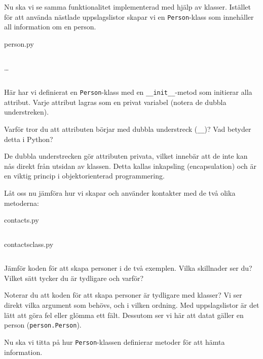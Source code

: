 Nu ska vi se samma funktionalitet implementerad med hjälp av klasser.
Istället för att använda nästlade uppslagslistor skapar vi en
\texttt{Person}-klass som innehåller all information om en person.

\begin{frame}[fragile]
  person.py \hrulefill
  \inputminted[linenos,firstline=3,lastline=15]{python}{examples/person.py}
  \dots
  \inputminted[linenos,firstline=65,lastline=68]{python}{examples/person.py}
\end{frame}

Här har vi definierat en \texttt{Person}-klass med en 
\texttt{__init__}-metod som initierar alla attribut. Varje attribut 
lagras som en privat variabel (notera de dubbla understreken).

\begin{exercise}
  Varför tror du att attributen börjar med dubbla understreck 
  (\texttt{__})? Vad betyder detta i Python?
\end{exercise}

De dubbla understrecken gör attributen privata, vilket innebär att de 
inte kan nås direkt från utsidan av klassen. Detta kallas inkapsling 
(encapsulation) och är en viktig princip i objektorienterad programmering.

Låt oss nu jämföra hur vi skapar och använder kontakter med de två 
olika metoderna:

\begin{frame}[fragile]
  contacts.py \hrulefill
  \inputminted[linenos,firstline=3,lastline=9]{python}{examples/contacts.py}
  \vspace{0.5em}
  contacts\textunderscore{}class.py \hrulefill
  \inputminted[linenos,firstline=3,lastline=9]{python}{examples/contacts_class.py}
\end{frame}

\begin{exercise}
  Jämför koden för att skapa personer i de två exemplen. Vilka skillnader ser 
  du? Vilket sätt tycker du är tydligare och varför?
\end{exercise}

Noterar du att koden för att skapa personer är tydligare med klasser? 
Vi ser direkt vilka argument som behövs, och i vilken ordning. Med 
uppslagslistor är det lätt att göra fel eller glömma ett fält.
Dessutom ser vi här att datat gäller en person 
(\texttt{person.Person}).

Nu ska vi titta på hur \texttt{Person}-klassen definierar 
metoder för att hämta information.

